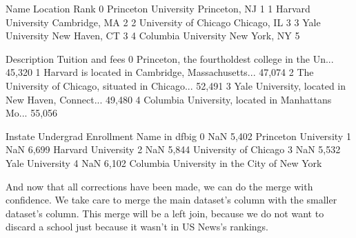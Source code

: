 \documentclass[letterpaper,10pt,english]{sphinxmanual}
\begin{document}
\begin{sphinxVerbatim}[commandchars=\\\{\}]
                    Name       Location  Rank  \PYGZbs{}
0   Princeton University  Princeton, NJ     1   
1     Harvard University  Cambridge, MA     2   
2  University of Chicago    Chicago, IL     3   
3        Yale University  New Haven, CT     3   
4    Columbia University   New York, NY     5   

                                         Description Tuition and fees  \PYGZbs{}
0  Princeton, the fourth\PYGZhy{}oldest college in the Un...         \PYGZdl{}45,320    
1  Harvard is located in Cambridge, Massachusetts...         \PYGZdl{}47,074    
2  The University of Chicago, situated in Chicago...         \PYGZdl{}52,491    
3  Yale University, located in New Haven, Connect...         \PYGZdl{}49,480    
4  Columbia University, located in Manhattan\PYGZsq{}s Mo...         \PYGZdl{}55,056    

  In\PYGZhy{}state Undergrad Enrollment                               Name in df\PYGZus{}big  
0      NaN                5,402                         Princeton University  
1      NaN                6,699                           Harvard University  
2      NaN                5,844                        University of Chicago  
3      NaN                5,532                              Yale University  
4      NaN                6,102  Columbia University in the City of New York  
\end{sphinxVerbatim}

 And now that all corrections have been made, we can do the merge with confidence.  We take care to merge the main dataset’s  column with the smaller dataset’s  column.  This merge will be a left join, because we do not want to discard a school just because it wasn’t in US News’s rankings.

\begin{sphinxVerbatim}[commandchars=\\\{\}]
        
\end{sphinxVerbatim}
\end{document}
